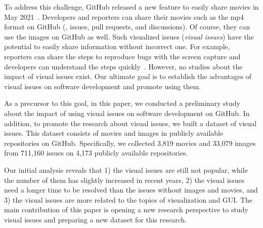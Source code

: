 To address this challenge, GitHub released a new feature 
to easily share movies in May 2021~\citep{github-video-blog}. 
Developers and reporters can share their movies such as the mp4 format 
on GitHub (\eg,  issues, pull requests, and discussions). 
Of course, they can use the images on GitHub as well. 
Such visualized issues (\textit{visual issues}) have the potential to 
easily share information without incorrect one.  
For example, reporters can share the steps to reproduce bugs 
with the screen capture and developers can understand 
the steps quickly~\citep{github-video-blog}.
However, no studies about the impact of visual issues exist. 
Our ultimate goal is to establish the advantages of visual issues 
on software development and promote using them.





As a precursor to this goal, in this paper, 
we conducted a preliminary study about the impact of 
using visual issues on software development on GitHub. 
In addition, to promote the research about visual issues, 
we built a dataset of visual issues. 
This dataset consists of movies and images 
in publicly available repositories on GitHub. 
Specifically, we collected 
3,819 movies and 
33,079 images from 
711,160 issues on
4,173 publicly available repositories.

Our initial analysis reveals that 
1) the visual issues are still not popular,
while the number of them has slightly increased in recent years, 
2) the visual issues need 
a longer time to be resolved than the issues without images and movies, and 
3) the visual issues are more related to 
the topics of visualization and GUI. 
The main contribution of this paper is 
opening a new research perspective to study visual issues
and preparing a new dataset for this research. 
